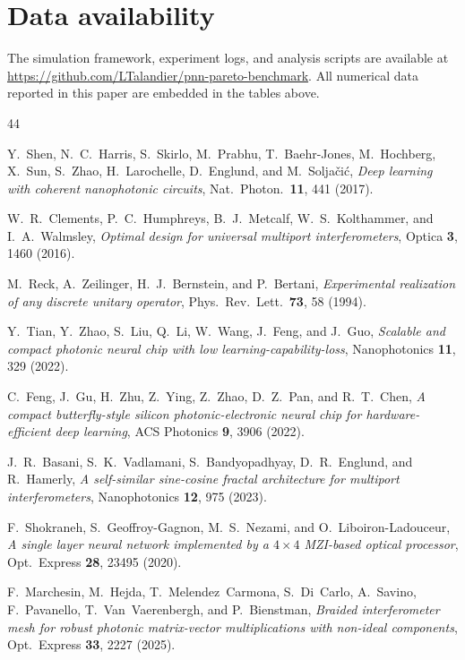 \documentclass[11pt,a4paper]{article}
\begin{document}
\section*{Data availability}

The simulation framework, experiment logs, and analysis scripts are available
at \url{https://github.com/LTalandier/pnn-pareto-benchmark}.  All numerical
data reported in this paper are embedded in the tables above.


\begin{thebibliography}{44}

Y.~Shen, N.~C.~Harris, S.~Skirlo, M.~Prabhu, T.~Baehr-Jones, M.~Hochberg, X.~Sun, S.~Zhao, H.~Larochelle, D.~Englund, and M.~Solja\v{c}i\'{c},
\textit{Deep learning with coherent nanophotonic circuits},
Nat.\ Photon.\ \textbf{11}, 441 (2017).

W.~R.~Clements, P.~C.~Humphreys, B.~J.~Metcalf, W.~S.~Kolthammer, and I.~A.~Walmsley,
\textit{Optimal design for universal multiport interferometers},
Optica \textbf{3}, 1460 (2016).

M.~Reck, A.~Zeilinger, H.~J.~Bernstein, and P.~Bertani,
\textit{Experimental realization of any discrete unitary operator},
Phys.\ Rev.\ Lett.\ \textbf{73}, 58 (1994).

Y.~Tian, Y.~Zhao, S.~Liu, Q.~Li, W.~Wang, J.~Feng, and J.~Guo,
\textit{Scalable and compact photonic neural chip with low learning-capability-loss},
Nanophotonics \textbf{11}, 329 (2022).

C.~Feng, J.~Gu, H.~Zhu, Z.~Ying, Z.~Zhao, D.~Z.~Pan, and R.~T.~Chen,
\textit{A compact butterfly-style silicon photonic-electronic neural chip for hardware-efficient deep learning},
ACS Photonics \textbf{9}, 3906 (2022).

J.~R.~Basani, S.~K.~Vadlamani, S.~Bandyopadhyay, D.~R.~Englund, and R.~Hamerly,
\textit{A self-similar sine-cosine fractal architecture for multiport interferometers},
Nanophotonics \textbf{12}, 975 (2023).

F.~Shokraneh, S.~Geoffroy-Gagnon, M.~S.~Nezami, and O.~Liboiron-Ladouceur,
\textit{A single layer neural network implemented by a $4 \times 4$ MZI-based optical processor},
Opt.\ Express \textbf{28}, 23495 (2020).

F.~Marchesin, M.~Hejda, T.~Melendez~Carmona, S.~Di~Carlo, A.~Savino, F.~Pavanello, T.~Van~Vaerenbergh, and P.~Bienstman,
\textit{Braided interferometer mesh for robust photonic matrix-vector multiplications with non-ideal components},
Opt.\ Express \textbf{33}, 2227 (2025).


\end{thebibliography}
\end{document}
